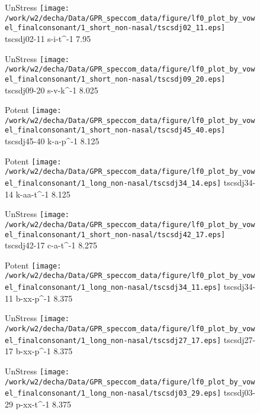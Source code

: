 \documentclass{article}
\begin{document}
\begin{figure}[t]
\begin{minipage}[b]{.24\textwidth}
UnStress
\centering
\texttt{[image: /work/w2/decha/Data/GPR\_speccom\_data/figure/lf0\_plot\_by\_vowel\_finalconsonant/1\_short\_non-nasal/tscsdj02\_11.eps]}
tscsdj02-11 s-i-t\textasciicircum-1 7.95
\end{minipage}
\begin{minipage}[b]{.24\textwidth}
UnStress
\centering
\texttt{[image: /work/w2/decha/Data/GPR\_speccom\_data/figure/lf0\_plot\_by\_vowel\_finalconsonant/1\_short\_non-nasal/tscsdj09\_20.eps]}
tscsdj09-20 s-v-k\textasciicircum-1 8.025
\end{minipage}
\begin{minipage}[b]{.24\textwidth}
\colorbox{Apricot}{Potent}
\centering
\texttt{[image: /work/w2/decha/Data/GPR\_speccom\_data/figure/lf0\_plot\_by\_vowel\_finalconsonant/1\_short\_non-nasal/tscsdj45\_40.eps]}
tscsdj45-40 k-a-p\textasciicircum-1 8.125
\end{minipage}
\begin{minipage}[b]{.24\textwidth}
\colorbox{Apricot}{Potent}
\centering
\texttt{[image: /work/w2/decha/Data/GPR\_speccom\_data/figure/lf0\_plot\_by\_vowel\_finalconsonant/1\_long\_non-nasal/tscsdj34\_14.eps]}
tscsdj34-14 k-aa-t\textasciicircum-1 8.125
\end{minipage}
\end{figure}

\begin{figure}[t]
\begin{minipage}[b]{.24\textwidth}
UnStress
\centering
\texttt{[image: /work/w2/decha/Data/GPR\_speccom\_data/figure/lf0\_plot\_by\_vowel\_finalconsonant/1\_short\_non-nasal/tscsdj42\_17.eps]}
tscsdj42-17 c-a-t\textasciicircum-1 8.275
\end{minipage}
\begin{minipage}[b]{.24\textwidth}
\colorbox{Apricot}{Potent}
\centering
\texttt{[image: /work/w2/decha/Data/GPR\_speccom\_data/figure/lf0\_plot\_by\_vowel\_finalconsonant/1\_long\_non-nasal/tscsdj34\_11.eps]}
tscsdj34-11 b-xx-p\textasciicircum-1 8.375
\end{minipage}
\begin{minipage}[b]{.24\textwidth}
UnStress
\centering
\texttt{[image: /work/w2/decha/Data/GPR\_speccom\_data/figure/lf0\_plot\_by\_vowel\_finalconsonant/1\_long\_non-nasal/tscsdj27\_17.eps]}
tscsdj27-17 b-xx-p\textasciicircum-1 8.375
\end{minipage}
\begin{minipage}[b]{.24\textwidth}
UnStress
\centering
\texttt{[image: /work/w2/decha/Data/GPR\_speccom\_data/figure/lf0\_plot\_by\_vowel\_finalconsonant/1\_long\_non-nasal/tscsdj03\_29.eps]}
tscsdj03-29 p-xx-t\textasciicircum-1 8.375
\end{minipage}
\end{figure}
\end{document}

